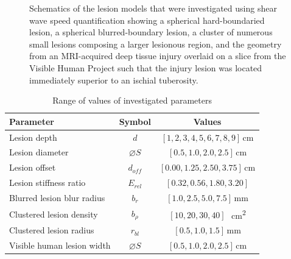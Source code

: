 \begin{figure}[!htb]
{
					\label{fig:shear_schematic_human}
				}
				\caption[Schematic of shear wave speed quantification-investigated lesions]{Schematics of the lesion models that were investigated using shear wave speed quantification showing \protect{} a spherical hard-boundaried lesion, \protect{} a spherical blurred-boundary lesion, \protect{} a cluster of numerous small lesions composing a larger lesionous region, and \protect{} the geometry from an MRI-acquired deep tissue injury overlaid on a slice from the Visible Human Project such that the injury lesion was located immediately superior to an ischial tuberosity.}	
				\label{fig:shear_schematics}
			\end{figure}

			\begin{table}[!htb]
				\centering
				\caption[Shear wave speed quantification model investigated parameters]{Range of values of investigated parameters}
				\label{tab:shear-parametervalues}
				\begin{tabular}{lcc}
					\toprule
					Parameter & Symbol & Values \\
					\midrule
					Lesion depth & $d$ & $[1, 2, 3, 4, 5, 6, 7, 8, 9]$\,\si{\cm} \\
					Lesion diameter & $\diameter S$ & $[0.5, 1.0, 2.0, 2.5]$\,\si{\cm} \\
					Lesion offset & $d_{off}$ & $[0.00, 1.25, 2.50, 3.75]$\,\si{\cm} \\
					Lesion stiffness ratio & $E_{rel}$ & $[0.32, 0.56, 1.80, 3.20]$ \\
					Blurred lesion blur radius & $b_r$ & $[1.0, 2.5, 5.0, 7.5]$\,\si{\mm} \\
					Clustered lesion density & $b_\rho$ & $[10, 20, 30, 40]$\,\si{\per\cm\squared} \\
					Clustered lesion radius & $r_{bl}$ & $[0.5, 1.0, 1.5]$\,\si{\mm} \\
					Visible human lesion width & $\diameter S$ & $[0.5, 1.0, 2.0, 2.5]$\,\si{\cm} \\
					\bottomrule
				\end{tabular}
			\end{table}

